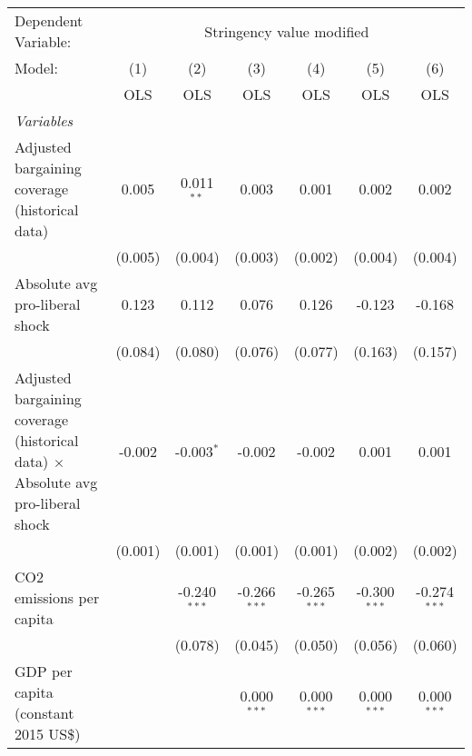 
\begingroup
\centering
\begin{tabular}{lcccccc}
   \toprule
   Dependent Variable: & \multicolumn{6}{c}{Stringency value modified}\\
   Model:                                                                                  & (1)     & (2)            & (3)            & (4)            & (5)            & (6)\\  
                                                                                           &  OLS    & OLS            & OLS            & OLS            & OLS            & OLS\\  
   \midrule
   \emph{Variables}\\
   Adjusted bargaining coverage (historical data)                                          & 0.005   & 0.011$^{**}$   & 0.003          & 0.001          & 0.002          & 0.002\\   
                                                                                           & (0.005) & (0.004)        & (0.003)        & (0.002)        & (0.004)        & (0.004)\\   
   Absolute avg pro-liberal shock                                                          & 0.123   & 0.112          & 0.076          & 0.126          & -0.123         & -0.168\\   
                                                                                           & (0.084) & (0.080)        & (0.076)        & (0.077)        & (0.163)        & (0.157)\\   
   Adjusted bargaining coverage (historical data) $\times$ Absolute avg pro-liberal shock  & -0.002  & -0.003$^{*}$   & -0.002         & -0.002         & 0.001          & 0.001\\   
                                                                                           & (0.001) & (0.001)        & (0.001)        & (0.001)        & (0.002)        & (0.002)\\   
   CO2 emissions per capita                                                                &         & -0.240$^{***}$ & -0.266$^{***}$ & -0.265$^{***}$ & -0.300$^{***}$ & -0.274$^{***}$\\   
                                                                                           &         & (0.078)        & (0.045)        & (0.050)        & (0.056)        & (0.060)\\   
   GDP per capita (constant 2015 US\$)                                                     &         &                & 0.000$^{***}$  & 0.000$^{***}$  & 0.000$^{***}$  & 0.000$^{***}$\\   

\end{tabular}
